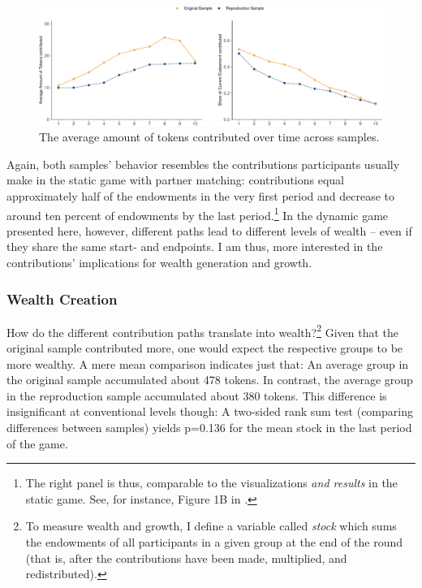 \documentclass[
  authoryear,
  review,
  3p,
  onecolumn]{elsarticle}
\begin{document}
\begin{figure}

{\centering \includegraphics{paper_files/figure-pdf/fig-share-of-contributions-1.pdf}

}

\caption{\label{fig-share-of-contributions}The average amount of tokens
contributed over time across samples.}

\end{figure}

Again, both samples' behavior resembles the contributions participants
usually make in the static game with partner matching: contributions
equal approximately half of the endowments in the very first period and
decrease to around ten percent of endowments by the last
period.\footnote{The right panel is thus, comparable to the
  visualizations \emph{and results} in the static game. See, for
  instance, Figure 1B in \citet[p.986]{fehrgaechter2000}.} In the
dynamic game presented here, however, different paths lead to different
levels of wealth -- even if they share the same start- and endpoints. I
am thus, more interested in the contributions' implications for wealth
generation and growth.

\hypertarget{sec-wealth}{%
\subsubsection{Wealth Creation}\label{sec-wealth}}

How do the different contribution paths translate into
wealth?\footnote{To measure wealth and growth, I define a variable
  called \emph{stock} which sums the endowments of all participants in a
  given group at the end of the round (that is, after the contributions
  have been made, multiplied, and redistributed).} Given that the
original sample contributed more, one would expect the respective groups
to be more wealthy. A mere mean comparison indicates just that: An
average group in the original sample accumulated about 478 tokens. In
contrast, the average group in the reproduction sample accumulated about
380 tokens. This difference is insignificant at conventional levels
though: A two-sided rank sum test (comparing differences between
samples) yields p=0.136 for the mean stock in the last period of the
game.
\end{document}
